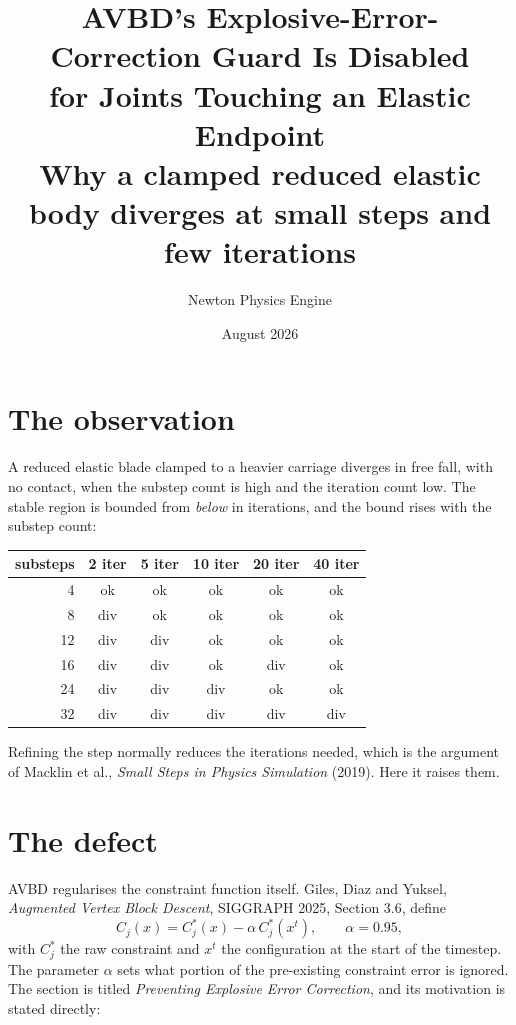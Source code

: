 \documentclass[11pt,a4paper]{article}
\title{\vspace{-1.2cm}\textbf{AVBD's Explosive-Error-Correction Guard Is Disabled\\ for Joints Touching an Elastic Endpoint}
\\[0.3em]\large\normalfont Why a clamped reduced elastic body diverges at small steps and few iterations}
\author{\normalsize Newton Physics Engine}
\date{\normalsize August 2026}
\begin{document}
\maketitle
\vspace{-0.6cm}

\section{The observation}

A reduced elastic blade clamped to a heavier carriage diverges in free fall, with no contact,
when the substep count is high and the iteration count low. The stable region is bounded from
\emph{below} in iterations, and the bound rises with the substep count:

\begin{center}\small
\begin{tabular}{@{}rccccc@{}}
\toprule
substeps & 2 iter & 5 iter & 10 iter & 20 iter & 40 iter \\
\midrule
4  & ok  & ok  & ok  & ok  & ok \\
8  & div & ok  & ok  & ok  & ok \\
12 & div & div & ok  & ok  & ok \\
16 & div & div & ok  & div & ok \\
24 & div & div & div & ok  & ok \\
32 & div & div & div & div & div \\
\bottomrule
\end{tabular}
\end{center}

Refining the step normally reduces the iterations needed, which is the argument of Macklin et
al., \emph{Small Steps in Physics Simulation} (2019). Here it raises them.

\section{The defect}

AVBD regularises the constraint function itself. Giles, Diaz and Yuksel,
\emph{Augmented Vertex Block Descent}, SIGGRAPH 2025, Section 3.6, define
\begin{equation}
  C_j(x) = C^*_j(x) - \alpha\,C^*_j(x^t),
  \qquad \alpha = 0.95 ,
  \label{eq:reg}
\end{equation}
with $C^*_j$ the raw constraint and $x^t$ the configuration at the start of the timestep. The
parameter $\alpha$ sets what portion of the pre-existing constraint error is ignored. The
section is titled \emph{Preventing Explosive Error Correction}, and its motivation is stated
directly:
\end{document}

